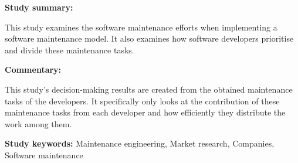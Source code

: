 \clearpage

\begin{tcolorbox}[colback=gray!5!white, colframe=deepblue!80!black, title=Trends in software maintenance tasks distribution among programmers: A study in a micro software company\cite{Stojanov2017}]
	\begin{minipage}[t]{0.25\textwidth}
		\textbf{Study summary:}
	\end{minipage}
	\hfill
	\begin{minipage}[t]{0.65\textwidth}
		This study examines the software maintenance efforts when implementing a software maintenance model. It also examines how software developers prioritise and divide these maintenance tasks.
	\end{minipage}

	\vspace{0.75em} 

	\begin{minipage}[t]{0.25\textwidth}
		\textbf{Commentary:}
	\end{minipage}
	\hfill
	\begin{minipage}[t]{0.65\textwidth}
		This study's decision-making results are created from the obtained maintenance tasks of the developers. It specifically only looks at the contribution of these maintenance tasks from each developer and how efficiently they distribute the work among them.
	\end{minipage}
	\tcblower
	\textbf{Study keywords:} Maintenance engineering, Market research, Companies, Software maintenance
\end{tcolorbox}


